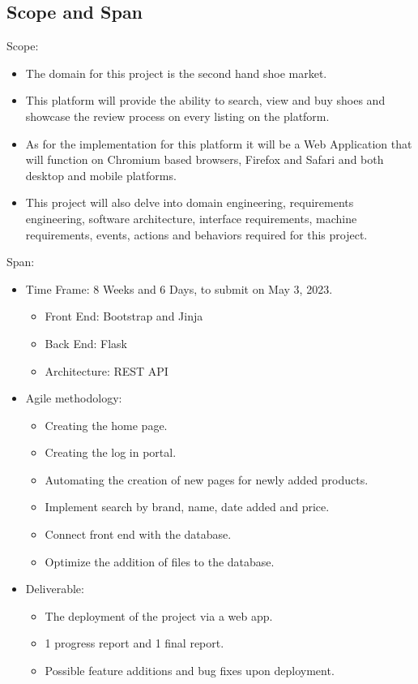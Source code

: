 \subsection{Scope and Span}
Scope:
\begin{itemize}
  \item The domain for this project is the second hand shoe market.
  \item This platform will provide the ability to search, view and buy shoes and showcase the review process on every listing on the platform.
  \item As for the implementation for this platform it will be a Web Application that will function on Chromium based browsers, Firefox and Safari and both desktop and mobile platforms.
        \item This project will also delve into domain engineering, requirements engineering, software architecture, interface requirements, machine requirements, events, actions and behaviors required for this project.
\end{itemize}
Span:
\begin{itemize}
  \item Time Frame: 8 Weeks and 6 Days, to submit on May 3, 2023.
        \begin{itemize}
          \item Front End: Bootstrap and Jinja \cite{JinjaJinjaDocumentation}
          \item Back End: Flask\cite{WelcomeFlaskFlask}
          \item Architecture: REST API
        \end{itemize}
  \item Agile methodology:
        \begin{itemize}
          \item Creating the home page.
          \item Creating the log in portal.
          \item Automating the creation of new pages for newly added products.
          \item Implement search by brand, name, date added and price.
          \item Connect front end with the database.
          \item Optimize the addition of files to the database.
        \end{itemize}
  \item Deliverable:
        \begin{itemize}
          \item The deployment of the project via a web app.
          \item 1 progress report and 1 final report.
          \item Possible feature additions and bug fixes upon deployment.
        \end{itemize}
\end{itemize}
